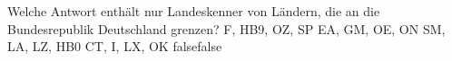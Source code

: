     {Welche Antwort enthält nur Landeskenner von Ländern, die an die Bundesrepublik Deutschland grenzen?}
    {F, HB9, OZ, SP}
    {EA, GM, OE, ON}
    {SM, LA, LZ, HB0}
    {CT, I, LX, OK}
    {false}{false}